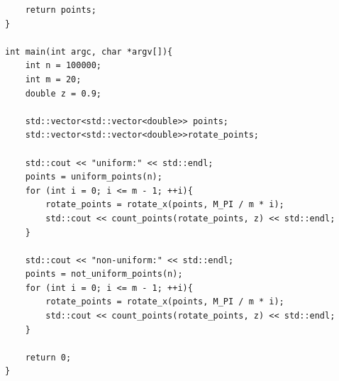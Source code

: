 \documentclass{article}
\begin{document}
\begin{lstlisting}
    return points;
}

int main(int argc, char *argv[]){
    int n = 100000;
    int m = 20;
    double z = 0.9;

    std::vector<std::vector<double>> points;
    std::vector<std::vector<double>>rotate_points;

    std::cout << "uniform:" << std::endl;
    points = uniform_points(n);
    for (int i = 0; i <= m - 1; ++i){
        rotate_points = rotate_x(points, M_PI / m * i);
        std::cout << count_points(rotate_points, z) << std::endl;
    }

    std::cout << "non-uniform:" << std::endl;
    points = not_uniform_points(n);
    for (int i = 0; i <= m - 1; ++i){
        rotate_points = rotate_x(points, M_PI / m * i);
        std::cout << count_points(rotate_points, z) << std::endl;
    }

    return 0;
}
\end{lstlisting}
\end{document}
